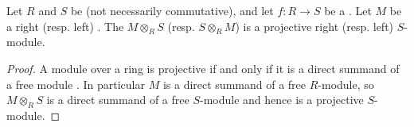 \begin{lemma} \label{lemma:base_change_of_projective_modules_along_ring_homomorphisms_are_projective}
    Let $R$ and $S$ be  (not necessarily commutative), and let $f: R \to S$ be a . 
    Let $M$ be a  right (resp. left) . The  $M \otimes_R S$ (resp. $S \otimes_R M$) is a projective right (resp. left) $S$-module.
\end{lemma}
\begin{proof}
    A module over a ring is projective if and only if it is a direct summand of a free module . In particular $M$ is a direct summand of a free $R$-module, so $M \otimes_R S$ is a direct summand of a free $S$-module and hence is a projective $S$-module.
\end{proof}